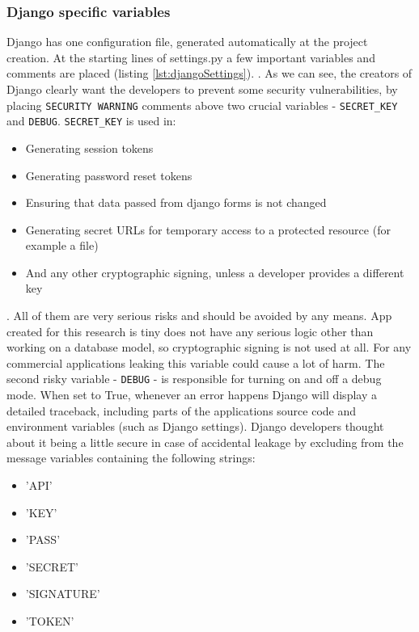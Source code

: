 \subsubsection{Django specific variables}
Django has one configuration file, generated automatically at the project creation. At the starting lines of settings.py a few important variables and comments are placed (listing \ref{lst:djangoSettings}).
.
As we can see, the creators of Django clearly want the developers to prevent some security vulnerabilities, by placing \lstinline{SECURITY WARNING} comments above two crucial variables - \lstinline{SECRET_KEY} and \lstinline{DEBUG}.
\lstinline{SECRET_KEY} is used in:
\begin{itemize}
    \item Generating session tokens
    \item Generating password reset tokens
    \item Ensuring that data passed from django forms is not changed
    \item Generating secret URLs for temporary access to a protected resource (for example a file)
    \item And any other cryptographic signing, unless a developer provides a different key
\end{itemize}.
All of them are very serious risks and should be avoided by any means. App created for this research is tiny does not have any serious logic other than working on a database model, so cryptographic signing is not used at all. For any commercial applications leaking this variable could cause a lot of harm.
The second risky variable - \lstinline{DEBUG} - is responsible for turning on and off a debug mode. When set to True, whenever an error happens Django will display a detailed traceback, including parts of the applications source code and environment variables (such as Django settings).
Django developers thought about it being a little secure in case of accidental leakage by excluding from the message variables containing the following strings:
\begin{itemize}
    \item 'API'
    \item 'KEY'
    \item 'PASS'
    \item 'SECRET'
    \item 'SIGNATURE'
    \item 'TOKEN'
\end{itemize}


